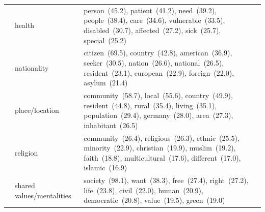 \begin{table}[!th]
\begin{tabular}{lp{}p{}}
 & health & person~(45.2), patient~(41.2), need~(39.2), people~(38.4), care~(34.6), vulnerable~(33.5), disabled~(30.7), affected~(27.2), sick~(25.7), special~(25.2) \\
 & nationality & citizen~(69.5), country~(42.8), american~(36.9), seeker~(30.5), nation~(26.6), national~(26.5), resident~(23.1), european~(22.9), foreign~(22.0), asylum~(21.4) \\
 & place/location & community~(58.7), local~(55.6), country~(49.9), resident~(44.8), rural~(35.4), living~(35.1), population~(29.4), germany~(28.0), area~(27.3), inhabitant~(26.5) \\
 & religion & community~(26.4), religious~(26.3), ethnic~(25.5), minority~(22.9), christian~(19.9), muslim~(19.2), faith~(18.8), multicultural~(17.6), different~(17.0), islamic~(16.9) \\
 & shared values/mentalities & society~(98.1), want~(38.3), free~(27.4), right~(27.2), life~(23.8), civil~(22.0), human~(20.9), democratic~(20.8), value~(19.5), green~(19.0) \\
\bottomrule
\end{tabular}
\end{table}
